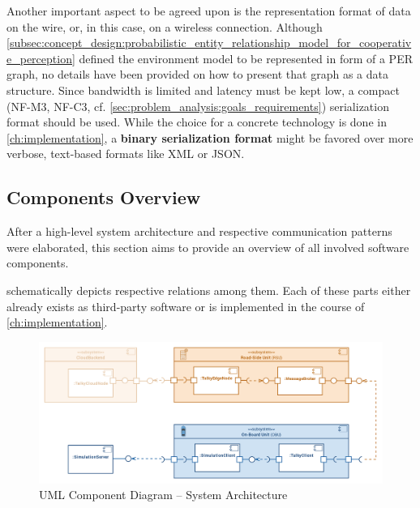\par
\bigskip

Another important aspect to be agreed upon is the representation format of data on the wire, or, in this case, on a wireless connection. Although \cref{subsec:concept_design:probabilistic_entity_relationship_model_for_cooperative_perception} defined the environment model to be represented in form of a PER graph, no details have been provided on how to present that graph as a data structure. Since bandwidth is limited and latency must be kept low, a compact (NF-M3, NF-C3, cf. \cref{sec:problem_analysis:goals_requirements}) serialization format should be used. While the choice for a concrete technology is done in \cref{ch:implementation}, a \textbf{binary serialization format} might be favored over more verbose, text-based formats like XML or JSON.


\subsection{Components Overview}
\label{subsec:concept_design:components_overview}
After a high-level system architecture and respective communication patterns were elaborated, this section aims to provide an overview of all involved software components.

 schematically depicts respective relations among them. Each of these parts either already exists as third-party software or is implemented in the course of \cref{ch:implementation}.

\begin{figure}
	\centering
	\includegraphics[width=1\linewidth]{98_images/components_plain}
	\caption{UML Component Diagram – System Architecture}
	\label{fig:components_plain}
\end{figure}

